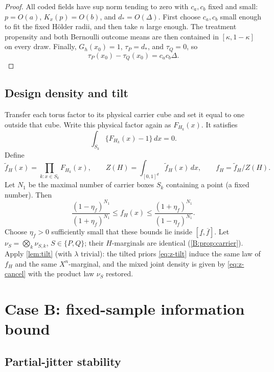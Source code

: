 \documentclass[11pt]{article}
\begin{document}
\begin{proof}
All coded fields have sup norm tending to zero with \(c_a,c_b\) fixed and
small: \(p=O(a)\), \(K_x(p)=O(b)\), and \(d_*=O(\Delta)\).  First choose
\(c_a,c_b\) small enough to fit the fixed Hölder radii, and then take \(n\)
large enough.  The treatment propensity and both Bernoulli outcome means are
then contained in \([\kappa,1-\kappa]\) on every draw.  Finally,
\(G_h(x_0)=1\), \(\tau_P=d_*\), and \(\tau_Q=0\), so
\[
 \tau_P(x_0)-\tau_Q(x_0)=c_ac_b\Delta.
\]
\end{proof}

\subsection{Design density and tilt}

Transfer each torus factor to its physical carrier cube and set it equal to
one outside that cube.  Write this physical factor again as \(F_{H_k}(x)\).
It satisfies
\[
 \int_{S_k}\{F_{H_k}(x)-1\}\,dx=0.
\]
Define
\begin{equation}
 \widetilde f_H(x)
 =\prod_{k:x\in S_k}F_{H_k}(x),
 \qquad
 Z(H)=\int_{[0,1]^d}\widetilde f_H(x)\,dx,
 \qquad
 f_H=\widetilde f_H/Z(H).
 \label{B:eq:density}
\end{equation}
Let \(N_1\) be the maximal number of carrier boxes \(S_k\) containing a
point (a fixed number).  Then
\begin{equation}
 \frac{(1-\eta_f)^{N_1}}{(1+\eta_f)^{N_1}}
 \le f_H(x)\le
 \frac{(1+\eta_f)^{N_1}}{(1-\eta_f)^{N_1}}.
 \label{B:eq:density-bounds}
\end{equation}
Choose \(\eta_f>0\) sufficiently small that these bounds lie inside
\([\underline f,\overline f]\).  Let \(\nu_S=\bigotimes_k\nu_{S,k}\),
\(S\in\{P,Q\}\); their \(H\)-marginals are identical
(\cref{B:prop:carrier}).  Apply \cref{lem:tilt} (with \(\lambda\) trivial):
the tilted priors \eqref{eq:z-tilt} induce the same law of \(f_H\) and the
same \(X^n\)-marginal, and the mixed joint density is given by
\eqref{eq:z-cancel} with the product law \(\nu_S\) restored.

\section{Case B: fixed-sample information bound}

\subsection{Partial-jitter stability}
\end{document}
